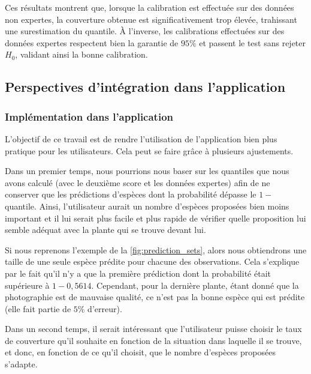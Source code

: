 \documentclass[a4paper,12pt]{article}
\begin{document}
Ces résultats montrent que, lorsque la calibration est effectuée sur des données non expertes, la couverture obtenue est significativement trop élevée, trahissant une surestimation du quantile. À l’inverse, les calibrations effectuées sur des données expertes respectent bien la garantie de $95\%$ et passent le test sans rejeter $H_0$, validant ainsi la bonne calibration.

\subsection{Perspectives d'intégration dans l'application}

\subsubsection{Implémentation dans l'application}

L'objectif de ce travail est de rendre l'utilisation de l'application bien plus pratique pour les utilisateurs. Cela peut se faire grâce à plusieurs ajustements.

\vspace{0.2cm}

Dans un premier temps, nous pourrions nous baser sur les quantiles que nous avons calculé (avec le deuxième score et les données expertes) afin de ne conserver que les prédictions d'espèces dont la probabilité dépasse le $1 -$ quantile. Ainsi, l'utilisateur aurait un nombre d'espèces proposées bien moins important et il lui serait plus facile et plus rapide de vérifier quelle proposition lui semble adéquat avec la plante qui se trouve devant lui.

\vspace{0.2cm}

Si nous reprenons l'exemple de la \autoref{fig:prediction_sets}, alors nous obtiendrons une taille de une seule espèce prédite pour chacune des observations. Cela s'explique par le fait qu'il n'y a que la première prédiction dont la probabilité était supérieure à $1 - 0,5614$. Cependant, pour la dernière plante, étant donné que la photographie est de mauvaise qualité, ce n'est pas la bonne espèce qui est prédite (elle fait partie de $5\%$ d'erreur).

\vspace{0.2cm}

Dans un second temps, il serait intéressant que l'utilisateur puisse choisir le taux de couverture qu'il souhaite en fonction de la situation dans laquelle il se trouve, et donc, en fonction de ce qu'il choisit, que le nombre d'espèces proposées s'adapte. 
\end{document}
